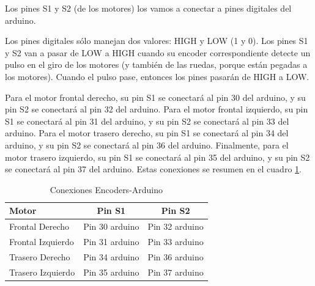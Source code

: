 \documentclass[12pt, letterpaper]{article}
\begin{document}
Los pines S1 y S2 (de los motores) los vamos a conectar a pines digitales del arduino. 

\begin{miencuadre}
    Los pines digitales sólo manejan dos valores: HIGH y LOW (1 y 0). Los pines S1 y S2 van a pasar de LOW a HIGH cuando su encoder correspondiente detecte un pulso en el giro de los motores (y también de las ruedas, porque están pegadas a los motores). Cuando el pulso pase, entonces los pines pasarán de HIGH a LOW. 
\end{miencuadre}

Para el motor frontal derecho, su pin S1 se conectará al pin 30 del arduino, y su pin S2 se conectará al pin 32 del arduino. Para el motor frontal izquierdo, su pin S1 se conectará al pin 31 del arduino, y su pin S2 se conectará al pin 33 del arduino. Para el motor trasero derecho, su pin S1 se conectará al pin 34 del arduino, y su pin S2 se conectará al pin 36 del arduino. Finalmente, para el motor trasero izquierdo, su pin S1 se conectará al pin 35 del arduino, y su pin S2 se conectará al pin 37 del arduino. Estas conexiones se resumen en el cuadro \ref{tab:conexiones-encoders}.

\begin{table}[h]
    \centering
    \begin{tabular}{|l|c|c|}
        \hline
        \textbf{Motor} & \textbf{Pin S1} & \textbf{Pin S2} \\ \hline
        Frontal Derecho   & Pin 30 arduino & Pin 32 arduino\\ 
        Frontal Izquierdo & Pin 31 arduino & Pin 33 arduino\\ 
        Trasero Derecho   & Pin 34 arduino & Pin 36 arduino\\ 
        Trasero Izquierdo & Pin 35 arduino & Pin 37 arduino\\ \hline
    \end{tabular}
    \caption{Conexiones Encoders-Arduino}
    \label{tab:conexiones-encoders}
\end{table}
\end{document}

